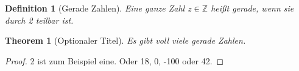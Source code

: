 \documentclass[a4paper,12pt,twoside,headsepline]{scrartcl}
\newtheorem{definition}{Definition}
\newtheorem{theorem}{Theorem}
\begin{document}
\begin{definition}[Gerade Zahlen]
 Eine ganze Zahl $z \in \mathbb Z$ heißt \emph{gerade}, wenn sie durch 2 teilbar ist.
\end{definition}

\begin{theorem}[Optionaler Titel]
 Es gibt voll viele gerade Zahlen.
\end{theorem}
\begin{proof}
 2 ist zum Beispiel eine. Oder 18, 0, -100 oder 42.
\end{proof}





\end{document}
